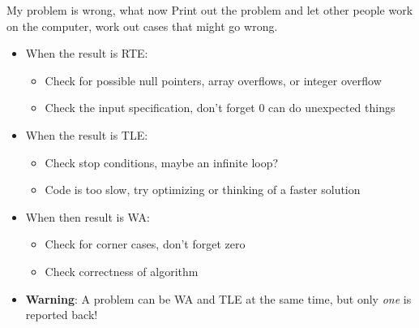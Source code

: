 \documentclass[11pt,pdf, aspectratio=169]{beamer}
\begin{document}
  \begin{frame}{My problem is wrong, what now}
    Print out the problem and let other people work on the computer, work out cases that might go wrong.
    \begin{itemize}
      \item When the result is RTE:
      \begin{itemize}
        \item Check for possible null pointers, array overflows, or integer overflow
        \item Check the input specification, don't forget 0 can do unexpected things
      \end{itemize}
      \item When the result is TLE:
      \begin{itemize}
        \item Check stop conditions, maybe an infinite loop?
        \item Code is too slow, try optimizing or thinking of a faster solution
      \end{itemize}
      \item When then result is WA:
      \begin{itemize}
        \item Check for corner cases, don't forget zero
        \item Check correctness of algorithm
      \end{itemize}
      \item \textbf{Warning}: A problem can be WA and TLE at the same time, but only \emph{one} is reported back!
    \end{itemize}
  \end{frame}
\end{document}
